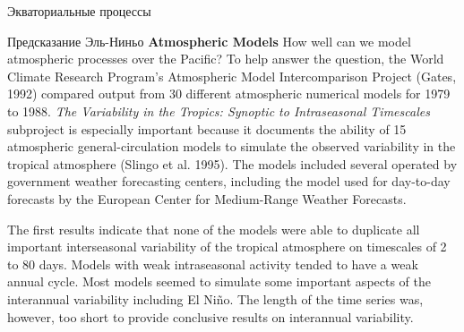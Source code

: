 \begin{chapter}{Экваториальные процессы}
\begin{section}{Предсказание Эль-Ниньо}
\textbf{Atmospheric Models} How well can we model atmospheric
processes over the  Pacific? To help answer
the question, the World Climate Research Program's Atmospheric Model
Intercomparison Project (Gates, 1992) compared output from 30
different atmospheric numerical models for 1979 to 1988. \textit{The
Variability in the Tropics: Synoptic to Intraseasonal Timescales}
subproject is especially important because it documents the ability of
15 atmospheric general-circulation models to simulate the observed
variability in the tropical atmosphere (Slingo et al. 1995). The
models included several operated by government weather forecasting
centers, including the model used for day-to-day forecasts by the
European Center for Medium-Range Weather Forecasts.
%

The first results indicate that none of the models were able to
duplicate all important interseasonal variability of the tropical
atmosphere on timescales of 2 to 80 days. Models with weak
intraseasonal activity tended to have a weak annual cycle. Most models
seemed to simulate some important aspects of the interannual
variability including El Ni\~{n}o. The length of the time series was,
however, too short to provide conclusive results on interannual
variability.
%


\end{section}
\end{chapter}
